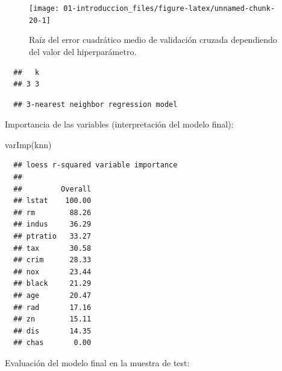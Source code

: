 \documentclass[
]{book}
\newenvironment{Shaded}{\begin{snugshade}}{\end{snugshade}}
\newcommand{\AttributeTok}[1]{\textcolor[rgb]{0.77,0.63,0.00}{#1}}
\newcommand{\FunctionTok}[1]{\textcolor[rgb]{0.00,0.00,0.00}{#1}}
\newcommand{\NormalTok}[1]{#1}
\newcommand{\SpecialCharTok}[1]{\textcolor[rgb]{0.00,0.00,0.00}{#1}}
\theoremstyle{break}
\theoremstyle{nonumberplain}
\begin{document}
\begin{figure}[!htb]

{\centering \texttt{[image: 01-introduccion\_files/figure-latex/unnamed-chunk-20-1]} 

}

\caption{Raíz del error cuadrático medio de validación cruzada dependiendo del valor del hiperparámetro.}\label{fig:unnamed-chunk-20}
\end{figure}

\begin{Shaded}
\end{Shaded}

\begin{verbatim}
  ##   k
  ## 3 3
\end{verbatim}

\begin{Shaded}
\end{Shaded}

\begin{verbatim}
  ## 3-nearest neighbor regression model
\end{verbatim}

Importancia de las variables (interpretación del modelo final):

\begin{Shaded}
\begin{Highlighting}[]
\FunctionTok{varImp}\NormalTok{(knn)}
\end{Highlighting}
\end{Shaded}

\begin{verbatim}
  ## loess r-squared variable importance
  ## 
  ##         Overall
  ## lstat    100.00
  ## rm        88.26
  ## indus     36.29
  ## ptratio   33.27
  ## tax       30.58
  ## crim      28.33
  ## nox       23.44
  ## black     21.29
  ## age       20.47
  ## rad       17.16
  ## zn        15.11
  ## dis       14.35
  ## chas       0.00
\end{verbatim}

Evaluación del modelo final en la muestra de test:

\begin{Shaded}
\end{Shaded}
\end{document}
